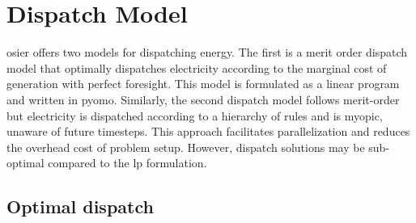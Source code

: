 \section{Dispatch Model}
\ac{osier} offers two models for dispatching energy. The first is a merit order
dispatch model that optimally dispatches electricity according to the marginal
cost of generation with perfect foresight. This model is formulated as a
linear program and written in \ac{pyomo}. Similarly, the second dispatch model follows
merit-order but electricity is dispatched according to a hierarchy of rules and
is myopic, unaware of future timesteps. This approach facilitates parallelization 
and reduces the overhead cost of problem setup. However, dispatch solutions may be 
sub-optimal compared to the \ac{lp} formulation.

\subsection{Optimal dispatch}
\label{section:merit_order}


